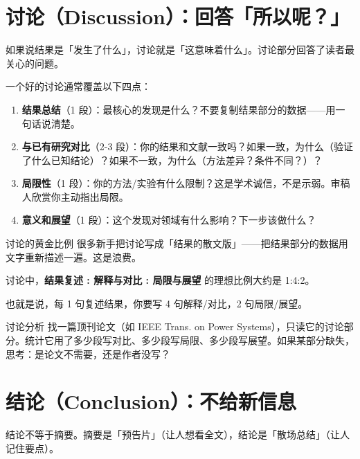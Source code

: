 \documentclass[12pt,a4paper]{ctexart}
\begin{document}
\section{讨论（Discussion）：回答「所以呢？」}

如果说结果是「发生了什么」，讨论就是「这意味着什么」。讨论部分回答了读者最关心的问题。

一个好的讨论通常覆盖以下四点：

\begin{enumerate}[label=(\arabic*),leftmargin=*]
    \item \textbf{结果总结}（1 段）：最核心的发现是什么？不要复制结果部分的数据——用一句话说清楚。
    \item \textbf{与已有研究对比}（2-3 段）：你的结果和文献一致吗？如果一致，为什么（验证了什么已知结论）？如果不一致，为什么（方法差异？条件不同？）？
    \item \textbf{局限性}（1 段）：你的方法/实验有什么限制？这是学术诚信，不是示弱。审稿人欣赏你主动指出局限。
    \item \textbf{意义和展望}（1 段）：这个发现对领域有什么影响？下一步该做什么？
\end{enumerate}

\begin{writingtip}{讨论的黄金比例}
    很多新手把讨论写成「结果的散文版」——把结果部分的数据用文字重新描述一遍。这是浪费。

    讨论中，\textbf{结果复述 : 解释与对比 : 局限与展望} 的理想比例大约是 1:4:2。

    也就是说，每 1 句复述结果，你要写 4 句解释/对比，2 句局限/展望。
\end{writingtip}

\begin{exercise}{讨论分析}
    找一篇顶刊论文（如 IEEE Trans. on Power Systems），只读它的讨论部分。统计它用了多少段写对比、多少段写局限、多少段写展望。如果某部分缺失，思考：是论文不需要，还是作者没写？
\end{exercise}


\section{结论（Conclusion）：不给新信息}

结论不等于摘要。摘要是「预告片」（让人想看全文），结论是「散场总结」（让人记住要点）。
\end{document}
